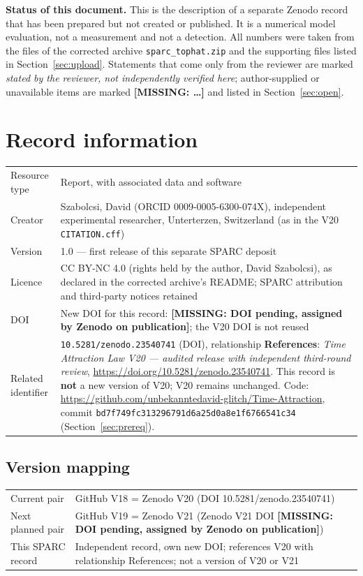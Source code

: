 \documentclass[10pt,a4paper]{article}
\newcommand{\missing}[1]{\textcolor{red!70!black}{\textbf{[MISSING: #1]}}}
\begin{document}
\noindent\textbf{Status of this document.} This is the description of a separate Zenodo record that has been prepared but not created or published. It is a numerical model evaluation, not a measurement and not a detection. All numbers were taken from the files of the corrected archive \texttt{sparc\_tophat.zip} and the supporting files listed in Section~\ref{sec:upload}. Statements that come only from the reviewer are marked \emph{stated by the reviewer, not independently verified here}; author-supplied or unavailable items are marked \missing{\dots} and listed in Section~\ref{sec:open}.

\section{Record information}
\begin{tabularx}{\textwidth}{@{}lL@{}}
\toprule
Resource type & Report, with associated data and software\\
Creator & Szabolcsi, David (ORCID 0009-0005-6300-074X), independent experimental researcher, Unterterzen, Switzerland (as in the V20 \texttt{CITATION.cff})\\
Version & 1.0 --- first release of this separate SPARC deposit\\
Licence & CC BY-NC 4.0 (rights held by the author, David Szabolcsi), as declared in the corrected archive's README; SPARC attribution and third-party notices retained\\
DOI & New DOI for this record: \missing{DOI pending, assigned by Zenodo on publication}; the V20 DOI is not reused\\
Related identifier & \texttt{10.5281/zenodo.23540741} (DOI), relationship \textbf{References}: \emph{Time Attraction Law V20 --- audited release with independent third-round review}, \url{https://doi.org/10.5281/zenodo.23540741}. This record is \textbf{not} a new version of V20; V20 remains unchanged. Code: \url{https://github.com/unbekanntedavid-glitch/Time-Attraction}, commit \texttt{bd7f749fc313296791d6a25d0a8e1f6766541c34} (Section~\ref{sec:prereq}).\\
\bottomrule
\end{tabularx}

\subsection{Version mapping}
\begin{tabularx}{\textwidth}{@{}lL@{}}
\toprule
Current pair & GitHub V18 = Zenodo V20 (DOI 10.5281/zenodo.23540741)\\
Next planned pair & GitHub V19 = Zenodo V21 (Zenodo V21 DOI \missing{DOI pending, assigned by Zenodo on publication})\\
This SPARC record & Independent record, own new DOI; references V20 with relationship References; not a version of V20 or V21\\
\bottomrule
\end{tabularx}
\end{document}
